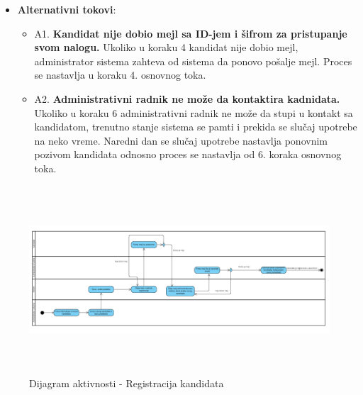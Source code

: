 \begin{itemize}
  \item \textbf{Alternativni tokovi}:
      \begin{itemize}
        \item A1. \textbf{Kandidat nije dobio mejl sa ID-jem i šifrom za pristupanje svom nalogu.}
        Ukoliko u koraku 4 kandidat nije dobio mejl, administrator sistema zahteva od sistema da ponovo pošalje mejl. Proces se nastavlja u koraku 4. osnovnog toka.
        \item A2. \textbf{Administrativni radnik ne može da kontaktira kadnidata.}
        Ukoliko u koraku 6 administrativni radnik ne može da stupi u kontakt sa kandidatom, trenutno stanje sistema se pamti i prekida se slučaj upotrebe na neko vreme. Naredni dan se slučaj upotrebe nastavlja ponovnim pozivom kandidata odnosno proces se nastavlja od 6. koraka osnovnog toka.
      \end{itemize}
\end{itemize}

\begin{figure}[H]
  \begin{center}
      \includegraphics[width=140mm, height=70mm]{Diagrams/dijagram_aktivnosti_registracija_kandidata.png}
  \end{center}
  \caption {Dijagram aktivnosti - Registracija kandidata}
  \label{activity_registracija}

\end{figure}
